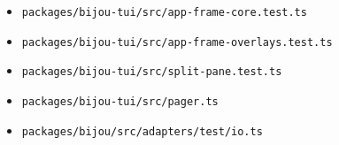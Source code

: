 \begin{itemize}
\item
  \texttt{p\allowbreak{}a\allowbreak{}c\allowbreak{}k\allowbreak{}a\allowbreak{}g\allowbreak{}e\allowbreak{}s\allowbreak{}/\allowbreak{}b\allowbreak{}i\allowbreak{}j\allowbreak{}o\allowbreak{}u\allowbreak{}-\allowbreak{}t\allowbreak{}u\allowbreak{}i\allowbreak{}/\allowbreak{}s\allowbreak{}r\allowbreak{}c\allowbreak{}/\allowbreak{}a\allowbreak{}p\allowbreak{}p\allowbreak{}-\allowbreak{}f\allowbreak{}r\allowbreak{}a\allowbreak{}m\allowbreak{}e\allowbreak{}-\allowbreak{}c\allowbreak{}o\allowbreak{}r\allowbreak{}e\allowbreak{}.\allowbreak{}t\allowbreak{}e\allowbreak{}s\allowbreak{}t\allowbreak{}.\allowbreak{}t\allowbreak{}s}
\item
  \texttt{p\allowbreak{}a\allowbreak{}c\allowbreak{}k\allowbreak{}a\allowbreak{}g\allowbreak{}e\allowbreak{}s\allowbreak{}/\allowbreak{}b\allowbreak{}i\allowbreak{}j\allowbreak{}o\allowbreak{}u\allowbreak{}-\allowbreak{}t\allowbreak{}u\allowbreak{}i\allowbreak{}/\allowbreak{}s\allowbreak{}r\allowbreak{}c\allowbreak{}/\allowbreak{}a\allowbreak{}p\allowbreak{}p\allowbreak{}-\allowbreak{}f\allowbreak{}r\allowbreak{}a\allowbreak{}m\allowbreak{}e\allowbreak{}-\allowbreak{}o\allowbreak{}v\allowbreak{}e\allowbreak{}r\allowbreak{}l\allowbreak{}a\allowbreak{}y\allowbreak{}s\allowbreak{}.\allowbreak{}t\allowbreak{}e\allowbreak{}s\allowbreak{}t\allowbreak{}.\allowbreak{}t\allowbreak{}s}
\item
  \texttt{p\allowbreak{}a\allowbreak{}c\allowbreak{}k\allowbreak{}a\allowbreak{}g\allowbreak{}e\allowbreak{}s\allowbreak{}/\allowbreak{}b\allowbreak{}i\allowbreak{}j\allowbreak{}o\allowbreak{}u\allowbreak{}-\allowbreak{}t\allowbreak{}u\allowbreak{}i\allowbreak{}/\allowbreak{}s\allowbreak{}r\allowbreak{}c\allowbreak{}/\allowbreak{}s\allowbreak{}p\allowbreak{}l\allowbreak{}i\allowbreak{}t\allowbreak{}-\allowbreak{}p\allowbreak{}a\allowbreak{}n\allowbreak{}e\allowbreak{}.\allowbreak{}t\allowbreak{}e\allowbreak{}s\allowbreak{}t\allowbreak{}.\allowbreak{}t\allowbreak{}s}
\item
  \texttt{p\allowbreak{}a\allowbreak{}c\allowbreak{}k\allowbreak{}a\allowbreak{}g\allowbreak{}e\allowbreak{}s\allowbreak{}/\allowbreak{}b\allowbreak{}i\allowbreak{}j\allowbreak{}o\allowbreak{}u\allowbreak{}-\allowbreak{}t\allowbreak{}u\allowbreak{}i\allowbreak{}/\allowbreak{}s\allowbreak{}r\allowbreak{}c\allowbreak{}/\allowbreak{}p\allowbreak{}a\allowbreak{}g\allowbreak{}e\allowbreak{}r\allowbreak{}.\allowbreak{}t\allowbreak{}s}
\item
  \texttt{p\allowbreak{}a\allowbreak{}c\allowbreak{}k\allowbreak{}a\allowbreak{}g\allowbreak{}e\allowbreak{}s\allowbreak{}/\allowbreak{}b\allowbreak{}i\allowbreak{}j\allowbreak{}o\allowbreak{}u\allowbreak{}/\allowbreak{}s\allowbreak{}r\allowbreak{}c\allowbreak{}/\allowbreak{}a\allowbreak{}d\allowbreak{}a\allowbreak{}p\allowbreak{}t\allowbreak{}e\allowbreak{}r\allowbreak{}s\allowbreak{}/\allowbreak{}t\allowbreak{}e\allowbreak{}s\allowbreak{}t\allowbreak{}/\allowbreak{}i\allowbreak{}o\allowbreak{}.\allowbreak{}t\allowbreak{}s}

\end{itemize}
